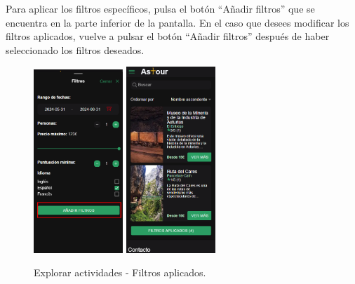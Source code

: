 Para aplicar los filtros específicos, pulsa el botón “Añadir filtros” que se encuentra en la parte inferior de la pantalla.
En el caso que desees modificar los filtros aplicados, vuelve a pulsar el botón “Añadir filtros” después de haber seleccionado los filtros deseados.
\begin{figure}[H]
	\centering
	\includegraphics[width=0.3\textwidth]{7-Construccion/Manuales/mobile/aplicar filtro.png}
	\includegraphics[width=0.3\textwidth]{7-Construccion/Manuales/mobile/lista filtrada de actividades.png}
	\caption{Explorar actividades - Filtros aplicados.}
\end{figure}

